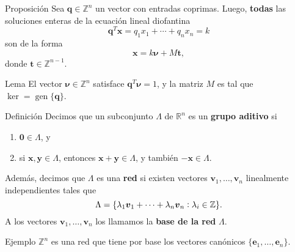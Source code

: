\documentclass[aspectratio=169,professionalfonts]{beamer}
\newcommand{\Z}{\mathbb{Z}}
\newcommand{\R}{\mathbb{R}}
\renewcommand{\ker}[1]{\mathop{\mathrm{ker}{\left\lbrace #1 \right\rbrace}}}
\renewcommand{\vec}[1]{\boldsymbol{#1}}
\DeclareMathOperator{\gen}{gen}
\newcommand{\braces}[1]{\lbrace #1 \rbrace}
\begin{document}
\begin{frame}
	\begin{block}{Proposición}
		Sea $\vec{q} \in \Z^n$ un vector con entradas coprimas. Luego,
		\textbf{todas} las soluciones enteras de la ecuación lineal diofantina
		\begin{equation*}
			\vec{q}^T\vec{x} = q_1x_1 + \cdots + q_nx_n = k
		\end{equation*}
		son de la forma
		\begin{equation*}
			\vec{x} = k\vec{\nu} + M\vec{t},
		\end{equation*}
		donde $\vec{t} \in \Z^{n-1}$.
	\end{block}
	\begin{block}{Lema}
		El vector $\vec{\nu} \in \Z^n$ satisface $\vec{q}^T\vec{\nu} = 1$, y la
		matriz $M$ es tal que $\ker{M^T} = \gen\braces{\vec{q}}$.
	\end{block}
\end{frame}

\begin{frame}
	\begin{block}{Definición}
		Decimos que un subconjunto $\Lambda$ de $\R^n$ es un \textbf{grupo
		aditivo} si
		\begin{enumerate}
			\item $\vec{0} \in \Lambda$, y
			\item si $\vec{x}, \vec{y} \in \Lambda$, entonces $\vec{x} + \vec{y}
				\in \Lambda$, y también $-\vec{x} \in \Lambda$.
		\end{enumerate}
		Además, decimos que $\Lambda$ es una \textbf{red} si existen vectores
		$\vec{v}_1, \ldots, \vec{v}_n$ linealmente independientes tales que
		\begin{equation*}
			\Lambda = \lbrace \lambda_1\vec{v}_1 + \cdots + \lambda_n\vec{v}_n \vcentcolon \lambda_i \in
			\Z \rbrace.
		\end{equation*}
		A los vectores $\vec{v}_1, \ldots, \vec{v}_n$ los llamamos la
		\textbf{base de la red} $\Lambda$.
	\end{block}
	\begin{block}{Ejemplo}
		$\Z^n$ es una red que tiene por base los vectores canónicos
		$\braces{\vec{e}_1, \ldots, \vec{e}_n}$.
	\end{block}
\end{frame}
\end{document}
